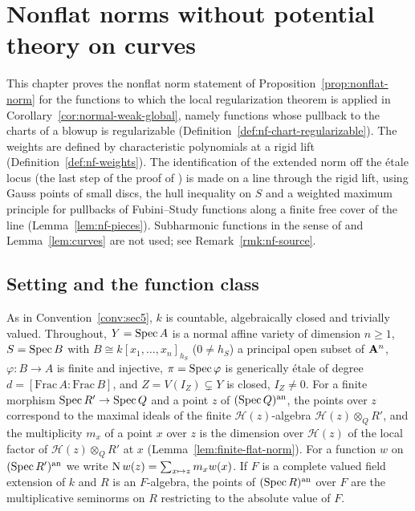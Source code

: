\section{Nonflat norms without potential theory on curves}\label{sec:nf-route}

This chapter proves the nonflat norm statement of Proposition~\ref{prop:nonflat-norm} for the functions to which the
local regularization theorem is applied in Corollary~\ref{cor:normal-weak-global}, namely functions whose pullback to
the charts of a blowup is regularizable (Definition~\ref{def:nf-chart-regularizable}). The weights are defined by
characteristic polynomials at a rigid lift (Definition~\ref{def:nf-weights}). The identification of the extended norm
off the \'etale locus (the last step of the proof of \cite[Proposition~5.22]{FHX}) is made on a line through the rigid
lift, using Gauss points of small discs, the hull inequality on $S$ and a weighted maximum principle for pullbacks of
Fubini--Study functions along a finite free cover of the line (Lemma~\ref{lem:nf-pieces}). Subharmonic functions in the
sense of \cite{GR25} and Lemma~\ref{lem:curves} are not used; see Remark~\ref{rmk:nf-source}.

\subsection{Setting and the function class}\label{subsec:nf-setting}

\begin{convention}\label{conv:nf-setting}
As in Convention~\ref{conv:sec5}, $k$ is countable, algebraically closed and trivially valued. Throughout,
$Y=\operatorname{Spec} A$ is a normal affine variety of dimension $n\ge1$, $S=\operatorname{Spec} B$ with $B\cong k[x_1,\dots,x_n]_{h_S}$
($0\ne h_S$) a principal open subset of $\mathbf{A}^n$, $\varphi\colon B\to A$ is finite and injective, $\pi=\operatorname{Spec}\varphi$ is
generically \'etale of degree $d=[\mathrm{Frac}\,A:\mathrm{Frac}\,B]$, and $Z=V(I_Z)\subsetneq Y$ is closed, $I_Z\ne0$.
For a finite morphism $\operatorname{Spec} R'\to\operatorname{Spec} Q$ and a point $z$ of $(\operatorname{Spec} Q)^{\mathrm{an}}$, the points over $z$ correspond to the
maximal ideals of the finite $\mathcal H(z)$-algebra $\mathcal H(z)\otimes_QR'$, and the multiplicity $m_x$ of a point
$x$ over $z$ is the dimension over $\mathcal H(z)$ of the local factor of $\mathcal H(z)\otimes_QR'$ at $x$
(Lemma~\ref{lem:finite-flat-norm}). For a function $w$ on $(\operatorname{Spec} R')^{\mathrm{an}}$ we write
$\operatorname{N} w(z)=\sum_{x\mapsto z}m_xw(x)$. If $F$ is a complete valued field extension of $k$ and $R$ is an $F$-algebra,
the points of $(\operatorname{Spec} R)^{\mathrm{an}}$ over $F$ are the multiplicative seminorms on $R$ restricting to the absolute value of $F$.
\end{convention}

